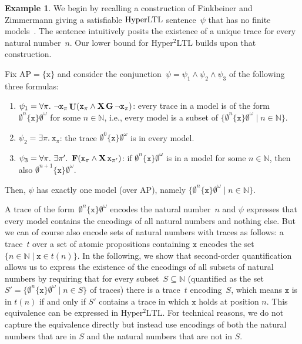 \documentclass[dvipsnames,10pt,a4paper]{amsart}
\theoremstyle{definition}
\newtheorem{exa}[thm]{Example}
\theoremstyle{remark}
\newcommand{\nats}{\mathbb{N}}
\newcommand{\set}[1]{\{#1\}}
\newcommand{\F}{\mathop{\mathbf{F}\vphantom{a}}\nolimits}
\newcommand{\G}{\mathop{\mathbf{G}\vphantom{a}}\nolimits}
\DeclareMathOperator{\U}{\mathbf{U}}
\newcommand{\X}{\mathop{\mathbf{X}\vphantom{a}}\nolimits}
\newcommand{\hyltl}{\mathrm{Hyper\-LTL}\xspace}
\newcommand{\sohyltl}{\mathrm{Hyper^2LTL}\xspace}
\newcommand{\ap}[0]{\mathrm{AP}}
\newcommand{\inprop}{\mathtt{x}}
\begin{document}
\begin{exa}
\label{example_hyltlcardlb}
We begin by recalling a construction of Finkbeiner and Zimmermann giving a satisfiable $\hyltl$ sentence~$\psi$ that has no finite models~\cite{FZ17}.
The sentence intuitively posits the existence of a unique trace for every natural number~$n$. Our lower bound for $\sohyltl$ builds upon that construction.

Fix $\ap=\set{\inprop}$ and consider the conjunction~$\psi = \psi_1 \wedge \psi_2 \wedge \psi_3$ of the following three formulas:
\begin{enumerate}
    \item $\psi_1 = \forall \pi.\ \neg \inprop_\pi \U ( \inprop_\pi \wedge \X \G \neg \inprop_\pi ) $: every trace in a model is of the form~$\emptyset^n \set{\inprop} \emptyset^\omega$ for some $n \in\nats$, i.e., every model is a subset of $\set{\emptyset^n \set{\inprop} \emptyset^\omega \mid n\in\nats}$. 
    
    \item $\psi_2 = \exists\pi.\ \inprop_\pi$: the trace $\emptyset^0 \set{\inprop} \emptyset^\omega$ is in every model.
    
    \item $\psi_3 = \forall \pi.\ \exists\pi'.\ \F (\inprop_\pi \wedge \X \inprop_{\pi'})$: if $\emptyset^n \set{\inprop} \emptyset^\omega$ is in a model for some $n\in\nats$, then also $\emptyset^{n+1} \set{\inprop} \emptyset^\omega$.
    
\end{enumerate}
Then, $\psi$ has exactly one model (over $\ap$), namely $\set{\emptyset^n \set{\inprop} \emptyset^\omega \mid n\in\nats}$.
\end{exa}

A trace of the form~$\emptyset^n \set{\inprop} \emptyset^\omega $ encodes the natural number~$n$ and $\psi$ expresses that every model contains the encodings of all natural numbers and nothing else.
But we can of course also encode sets of natural numbers with traces as follows: a trace~$t$ over a set of atomic propositions containing $\inprop$ encodes the set~$\set{n \in \nats \mid \inprop \in t(n)}$. 
In the following, we show that second-order quantification allows us to express the existence of the encodings of all subsets of natural numbers by requiring that for every subset~$S \subseteq \nats$ (quantified as the set $S' = \set{\emptyset^n \set{\inprop} \emptyset^\omega \mid n\in S}$ of traces) there is a trace~$t$ encoding~$S$, which means $\inprop$ is in $t(n)$ if and only if $S'$ contains a trace in which $\inprop$ holds at position $n$.
This equivalence can be expressed in $\sohyltl$.
For technical reasons, we do not capture the equivalence directly but instead use encodings of both the natural numbers that are in $S$ and the natural numbers that are not in $S$.
\end{document}
